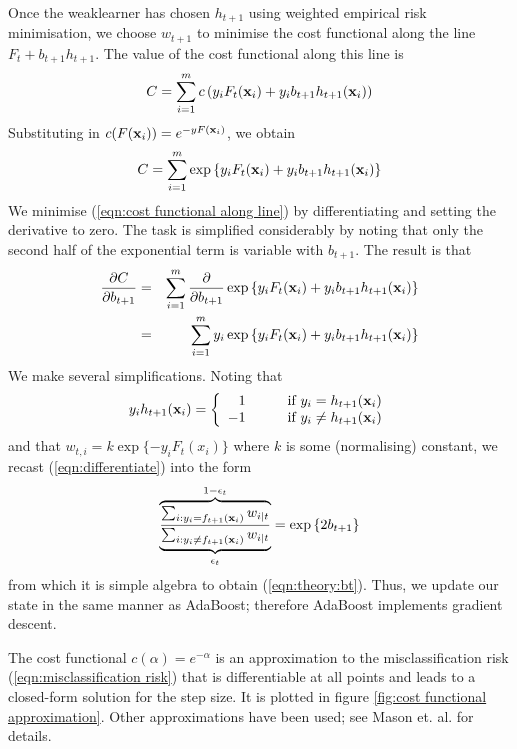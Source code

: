 Once the weaklearner has chosen $h_{t+1}$ using weighted empirical risk
minimisation, we choose $w_{t+1}$ to minimise the cost functional
along the line $F_t + b_{t+1} h_{t+1}$.  The value of the cost
functional along this line is
%
\begin{equation}
C = \sum_{i=1}^{m} c \left( y_i F_t(\mathbf{x}_i) + y_i b_{t+1}
h_{t+1}(\mathbf{x}_i) \right)
\end{equation}
%
Substituting in $c(F(\mathbf{x}_i)) = e^{-yF(\mathbf{x}_i)}$, we obtain
%
\begin{equation}
C = \sum_{i=1}^{m} \exp \left\{ y_i F_t(\mathbf{x}_i) + y_i b_{t+1}
h_{t+1}(\mathbf{x}_i) \right\}
\label{eqn:cost functional along line}
\end{equation}
%
We minimise (\ref{eqn:cost functional along line}) by
differentiating and setting the derivative to zero.  The task is
simplified considerably by noting that only the second half of the
exponential term is variable with $b_{t+1}$.  The result is that
%
\begin{eqnarray}
\label{eqn:differentiate}
\frac{\partial C}{\partial b_{t+1}} &
= & \sum_{i=1}^{m} \frac{\partial}{\partial b_{t+1}}
\exp \left\{ y_i F_t(\mathbf{x}_i) + y_i b_{t+1}
h_{t+1}(\mathbf{x}_i) \right\} \nonumber \\
& = & \sum_{i=1}^{m} y_i \exp \left\{ y_i F_t(\mathbf{x}_i) + y_i b_{t+1}
h_{t+1}(\mathbf{x}_i) \right\} 
\end{eqnarray}
%
We make several simplifications.  Noting that
%
\begin{equation}
y_i h_{t+1}(\mathbf{x}_i) = \left\{ 
	\begin{array}{rl}
	1 &	\qquad \mbox{if $y_i = h_{t+1}(\mathbf{x}_i)$} \\
	-1 &	\qquad \mbox{if $y_i \neq h_{t+1}(\mathbf{x}_i)$}
	\end{array}
\right.
\end{equation}
%
and that $w_{t,i} = k \exp \{ -y_i F_t(x_i) \}$ where $k$ is some
(normalising) constant, we recast (\ref{eqn:differentiate}) into
the form 
%
\begin{equation}
\overbrace{
\underbrace{
	\frac{\sum_{i : y_i = f_{t+1}(\mathbf{x}_i)} w_{i|t}}
	     {\sum_{i : y_i \neq f_{t+1}(\mathbf{x}_i)} w_{i|t}}
}_{\epsilon_t}
}^{1 - \epsilon_t}
= \exp \left\{ 2 b_{t+1} \right\} 
\end{equation}
%
from which it is simple algebra to obtain (\ref{eqn:theory:bt}).
Thus, we update our state in the same manner as AdaBoost; therefore
AdaBoost implements gradient descent.

The cost functional $c(\alpha) = e^{-\alpha}$ is an approximation to
the misclassification risk (\ref{eqn:misclassification risk}) that is
differentiable at all points and leads to a closed-form solution for
the step size.  It is plotted in figure \ref{fig:cost functional
approximation}.  Other approximations have been used; see Mason
et. al. \cite{Mason99} for details.

